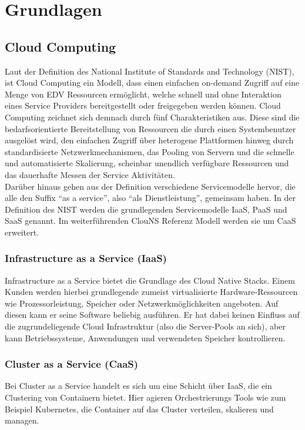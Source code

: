 \chapter{Grundlagen}

\section{Cloud Computing}
Laut der Definition des National Institute of Standards and Technology (NIST), ist Cloud Computing ein Modell, dass einen einfachen on-demand Zugriff auf eine Menge von EDV Ressourcen ermöglicht, welche schnell und ohne Interaktion eines Service Providers bereitgestellt oder freigegeben werden können\cite{mell_nist_2011}.
Cloud Computing zeichnet sich demnach durch fünf Charakteristiken aus. Diese sind die bedarfsorientierte Bereitstellung von Ressourcen die durch einen Systembenutzer ausgelöst wird, den einfachen Zugriff über heterogene Plattformen hinweg durch standardisierte Netzwerkmechanismen, das Pooling von Servern und die schnelle und automatisierte Skalierung, scheinbar unendlich verfügbare Ressourcen und das dauerhafte Messen der Service Aktivitäten. \\
Darüber hinaus gehen aus der Definition verschiedene Servicemodelle hervor, die alle den Suffix "`as a service"', also "`als Dienstleistung"', gemeinsam haben. In der Definition des NIST werden die grundlegenden Servicemodelle IaaS, PaaS und SaaS genannt. Im weiterführenden ClouNS Referenz Modell\cite{kratzke_clouns_2016} werden sie um CaaS erweitert. \\

\subsection{Infrastructure as a Service (IaaS)}
Infrastructure as a Service bietet die Grundlage des Cloud Native Stacks. Einem Kunden werden hierbei grundlegende zumeist virtualisierte Hardware-Ressourcen wie Prozessorleistung, Speicher oder Netzwerkmöglichkeiten angeboten. Auf diesen kann er seine Software beliebig ausführen. Er hat dabei keinen Einfluss auf die zugrundeliegende Cloud Infrastruktur (also die Server-Pools an sich), aber kann Betriebssysteme, Anwendungen und verwendeten Speicher kontrollieren\cite{mell_nist_2011}. \\

\subsection{Cluster as a Service (CaaS)}
Bei Cluster as a Service handelt es sich um eine Schicht über IaaS, die ein Clustering von Containern bietet. Hier agieren Orchestrierungs Tools wie zum Beispiel Kubernetes, die Container auf das Cluster verteilen, skalieren und managen\cite{kratzke_clouns_2016}. \\

